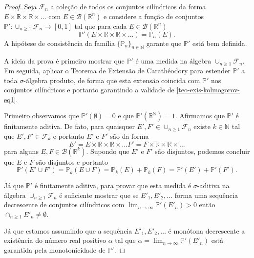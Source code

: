 \begin{proof}
Seja $\mathcal{F}_n$ 
a coleção de todos os conjuntos cilíndricos da 
forma $E\times\mathbb{R}\times\mathbb{R}\times\ldots$
com $E\in\mathscr{B}(\mathbb{R}^n)$
e considere a função de conjuntos 
$\mathbb{P}':\cup_{n\geq 1}\mathcal{F}_n\to [0,1]$
tal que para cada $E\in\mathscr{B}(\mathbb{R}^n)$ 
\[
\mathbb{P}'(E\times\mathbb{R}\times\mathbb{R}\times\ldots)
=
\mathbb{P}_n(E).
\] 
A hipótese de consistência da família $\{\mathbb{P}_n\}_{n\in\mathbb{N}}$
garante que $\mathbb{P}'$ está bem definida. 


A ideia da prova é primeiro mostrar que $\mathbb{P}'$ é uma medida na álgebra 
$\cup_{n\geq 1}\mathcal{F}_n$. Em seguida, aplicar o 
Teorema de Extensão de Carathéodory para estender $\mathbb{P}'$
a toda $\sigma$-álgebra produto, de forma que esta 
extensão coincida com $\mathbb{P}'$ 
nos conjuntos cilíndricos e portanto garantindo a 
validade de \eqref{teo-exis-kolmogorov-eq1}.

Primeiro observamos que $\mathbb{P}'(\emptyset)=0$ 
e que $\mathbb{P}'(\mathbb{R}^{\mathbb{N}})=1$.
Afirmamos que $\mathbb{P}'$ é finitamente aditiva.
De fato, para quaisquer 
$E',F'\in \cup_{n\geq 1}\mathcal{F}_n$ 
existe $k\in\mathbb{N}$ tal que $E',F'\in \mathcal{F}_{k}$
e portanto $E'$ e $F'$ são da forma 
\[
E'= E\times\mathbb{R}\times\mathbb{R}\times\ldots
F'= F\times\mathbb{R}\times\mathbb{R}\times\ldots
\]
para alguns $E,F\in\mathscr{B}(\mathbb{R}^k)$.
Supondo que $E'$ e $F'$ são disjuntos, podemos concluir que
$E$ e $F$ são disjuntos e portanto 
\[
\mathbb{P}'(E'\cup F')
=
\mathbb{P}_{k}(E\cup F)
=
\mathbb{P}_{k}(E)+\mathbb{P}_{k}(F)
=
\mathbb{P}'(E')+\mathbb{P}'(F').
\]

Já que $\mathbb{P}'$ é finitamente aditiva, para provar 
que esta medida é $\sigma$-aditiva na álgebra 
$\cup_{n\geq 1}\mathcal{F}_n$ é suficiente mostrar que 
se $E'_1,E'_2,\ldots $ forma uma sequência decrescente de 
conjuntos cilíndricos com 
$\lim_{n\to\infty}\mathbb{P}'(E'_n)>0$ então 
$\cap_{n\geq 1}E'_n \neq \emptyset$.


Já que estamos assumindo que 
a sequência $E'_1,E'_2,\ldots $ é monótona decrescente 
a existência do número  
real positivo $\alpha$ tal que 
 $\alpha= \lim_{n\to\infty}\mathbb{P}'(E'_n)$
está garantida pela monotonicidade de $\mathbb{P}'$.


\end{proof}

